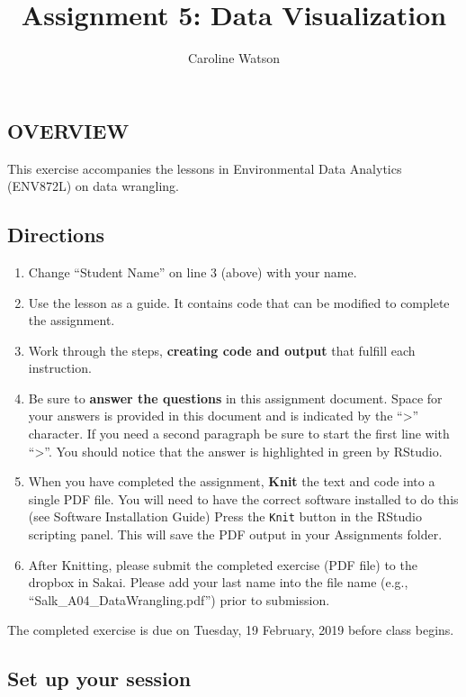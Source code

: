 \documentclass[]{article}
\title{Assignment 5: Data Visualization}
\author{Caroline Watson}
\date{}
\providecommand{\tightlist}{%
  \setlength{\itemsep}{0pt}\setlength{\parskip}{0pt}}
\begin{document}
\maketitle

\subsection{OVERVIEW}\label{overview}

This exercise accompanies the lessons in Environmental Data Analytics
(ENV872L) on data wrangling.

\subsection{Directions}\label{directions}

\begin{enumerate}
\def\labelenumi{\arabic{enumi}.}
\tightlist
\item
  Change ``Student Name'' on line 3 (above) with your name.
\item
  Use the lesson as a guide. It contains code that can be modified to
  complete the assignment.
\item
  Work through the steps, \textbf{creating code and output} that fulfill
  each instruction.
\item
  Be sure to \textbf{answer the questions} in this assignment document.
  Space for your answers is provided in this document and is indicated
  by the ``\textgreater{}'' character. If you need a second paragraph be
  sure to start the first line with ``\textgreater{}''. You should
  notice that the answer is highlighted in green by RStudio.
\item
  When you have completed the assignment, \textbf{Knit} the text and
  code into a single PDF file. You will need to have the correct
  software installed to do this (see Software Installation Guide) Press
  the \texttt{Knit} button in the RStudio scripting panel. This will
  save the PDF output in your Assignments folder.
\item
  After Knitting, please submit the completed exercise (PDF file) to the
  dropbox in Sakai. Please add your last name into the file name (e.g.,
  ``Salk\_A04\_DataWrangling.pdf'') prior to submission.
\end{enumerate}

The completed exercise is due on Tuesday, 19 February, 2019 before class
begins.

\subsection{Set up your session}\label{set-up-your-session}
\end{document}
